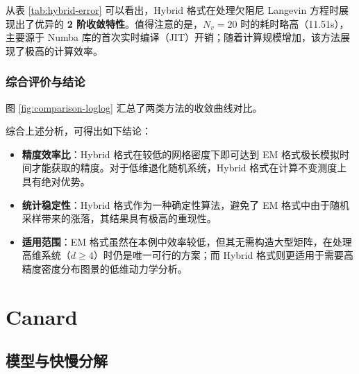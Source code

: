 	从表 \ref{tab:hybrid-error} 可以看出，Hybrid 格式在处理欠阻尼 Langevin 方程时展现出了优异的 \textbf{2 阶收敛特性}。值得注意的是，$N_v=20$ 时的耗时略高（11.51s），主要源于 Numba 库的首次实时编译（JIT）开销；随着计算规模增加，该方法展现了极高的计算效率。
	
	\subsubsection{综合评价与结论}
	
	图 \ref{fig:comparison-loglog} 汇总了两类方法的收敛曲线对比。
	
	
	综合上述分析，可得出如下结论：
	\begin{itemize}
		\item \textbf{精度效率比}：Hybrid 格式在较低的网格密度下即可达到 EM 格式极长模拟时间才能获取的精度。对于低维退化随机系统，Hybrid 格式在计算不变测度上具有绝对优势。
		\item \textbf{统计稳定性}：Hybrid 格式作为一种确定性算法，避免了 EM 格式中由于随机采样带来的涨落，其结果具有极高的重现性。
		\item \textbf{适用范围}：EM 格式虽然在本例中效率较低，但其无需构造大型矩阵，在处理高维系统（$d \ge 4$）时仍是唯一可行的方案；而 Hybrid 格式则更适用于需要高精度密度分布图景的低维动力学分析。
	\end{itemize}
	
	
	

\section{Canard}

\subsection{模型与快慢分解}

